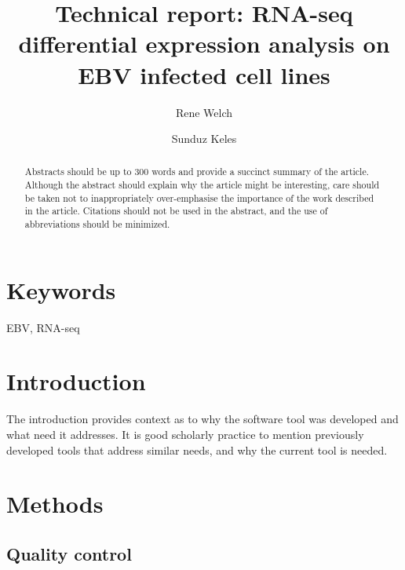 \documentclass[9pt,a4paper,]{extarticle}
\begin{document}
\pagestyle{front}

\title{Technical report: RNA-seq differential expression analysis on EBV infected cell lines}

\author[1]{Rene Welch}
\author[2]{Sunduz Keles}

\maketitle
\thispagestyle{front}

\begin{abstract}
Abstracts should be up to 300 words and provide a succinct summary of the article. Although the abstract should explain why the article might be interesting, care should be taken not to inappropriately over-emphasise the importance of the work described in the article. Citations should not be used in the abstract, and the use of abbreviations should be minimized.
\end{abstract}

\section*{Keywords}
EBV, RNA-seq


\clearpage
\pagestyle{main}

\hypertarget{introduction}{%
\section{Introduction}\label{introduction}}

The introduction provides context as to why the software tool was developed and what need it addresses. It is good scholarly practice to mention previously developed tools that address similar needs, and why the current tool is needed.

\hypertarget{methods}{%
\section{Methods}\label{methods}}

\hypertarget{quality-control}{%
\subsection{Quality control}\label{quality-control}}
\end{document}
